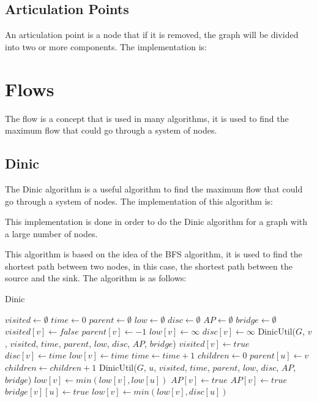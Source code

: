 \subsection{Articulation Points}

An articulation point is a node that if it is removed, the graph will be divided into two or more components. The implementation is:



\section{Flows}

The flow is a concept that is used in many algorithms, it is used to find the maximum flow that could go through a system of nodes.

\subsection{Dinic}

The Dinic algorithm is a useful algorithm to find the maximum flow that could go through a system of nodes. The implementation of this algorithm is:



This implementation is done in order to do the Dinic algorithm for a graph with a large number of nodes.

This algorithm is based on the idea of the BFS algorithm, it is used to find the shortest path between two nodes, in this case, the shortest path between the source and the sink. The algorithm is as follows:

\begin{algorithm}
\caption{Dinic}
\label{alg:dinic}
\begin{algorithmic}[1]
\State $visited \gets \emptyset$
\State $time \gets 0$
\State $parent \gets \emptyset$
\State $low \gets \emptyset$
\State $disc \gets \emptyset$
\State $AP \gets \emptyset$
\State $bridge \gets \emptyset$
\State $visited[v] \gets false$
\State $parent[v] \gets -1$
\State $low[v] \gets \infty$
\State $disc[v] \gets \infty$
\EndFor
{}
\State DinicUtil($G$, $v$, $visited$, $time$, $parent$, $low$, $disc$, $AP$, $bridge$)
\EndIf
\EndFor
\EndProcedure
{}
\State $visited[v] \gets true$
\State $disc[v] \gets time$
\State $low[v] \gets time$
\State $time \gets time + 1$
\State $children \gets 0$
\State $parent[u] \gets v$
\State $children \gets children + 1$
\State DinicUtil($G$, $u$, $visited$, $time$, $parent$, $low$, $disc$, $AP$, $bridge$)
\State $low[v] \gets min(low[v], low[u])$
\State $AP[v] \gets true$
\EndIf
{}
\State $AP[v] \gets true$
\EndIf
{}
\State $bridge[v][u] \gets true$
\EndIf
\Else
\State $low[v] \gets min(low[v], disc[u])$
\EndIf
\EndFor
\EndProcedure
\end{algorithmic}
\end{algorithm}

